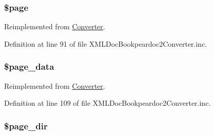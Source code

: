 \hypertarget{class_x_m_l_doc_bookpeardoc2_converter_a0a44e6760141442bb439b1ab1395d8ff}{
\subsubsection[{\$page}]{\setlength{\rightskip}{0pt plus 5cm}\$page}}\label{class_x_m_l_doc_bookpeardoc2_converter_a0a44e6760141442bb439b1ab1395d8ff}


\-Reimplemented from \hyperlink{class_converter_a0a44e6760141442bb439b1ab1395d8ff}{\-Converter}.



\-Definition at line 91 of file \-X\-M\-L\-Doc\-Bookpeardoc2\-Converter.\-inc.

\hypertarget{class_x_m_l_doc_bookpeardoc2_converter_a22fa57ada47299e1b00ca90f550a1194}{
\subsubsection[{\$page\-\_\-data}]{\setlength{\rightskip}{0pt plus 5cm}\$page\-\_\-data}}\label{class_x_m_l_doc_bookpeardoc2_converter_a22fa57ada47299e1b00ca90f550a1194}


\-Reimplemented from \hyperlink{class_converter_a22fa57ada47299e1b00ca90f550a1194}{\-Converter}.



\-Definition at line 109 of file \-X\-M\-L\-Doc\-Bookpeardoc2\-Converter.\-inc.

\hypertarget{class_x_m_l_doc_bookpeardoc2_converter_ab554c658003c5e2653580ba881cd50eb}{
\subsubsection[{\$page\-\_\-dir}]{\setlength{\rightskip}{0pt plus 5cm}\$page\-\_\-dir}}\label{class_x_m_l_doc_bookpeardoc2_converter_ab554c658003c5e2653580ba881cd50eb}


